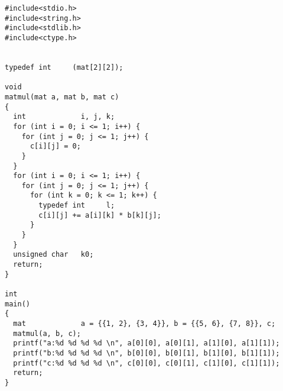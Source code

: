  \begin{verbatim}
#include<stdio.h>
#include<string.h>
#include<stdlib.h>
#include<ctype.h>


typedef int     (mat[2][2]);

void
matmul(mat a, mat b, mat c)
{
  int             i, j, k;
  for (int i = 0; i <= 1; i++) {
    for (int j = 0; j <= 1; j++) {
      c[i][j] = 0;
    }
  }
  for (int i = 0; i <= 1; i++) {
    for (int j = 0; j <= 1; j++) {
      for (int k = 0; k <= 1; k++) {
        typedef int     l;
        c[i][j] += a[i][k] * b[k][j];
      }
    }
  }
  unsigned char   k0;
  return;
}

int
main()
{
  mat             a = {{1, 2}, {3, 4}}, b = {{5, 6}, {7, 8}}, c;
  matmul(a, b, c);
  printf("a:%d %d %d %d \n", a[0][0], a[0][1], a[1][0], a[1][1]);
  printf("b:%d %d %d %d \n", b[0][0], b[0][1], b[1][0], b[1][1]);
  printf("c:%d %d %d %d \n", c[0][0], c[0][1], c[1][0], c[1][1]);
  return;
}
\end{verbatim} 
